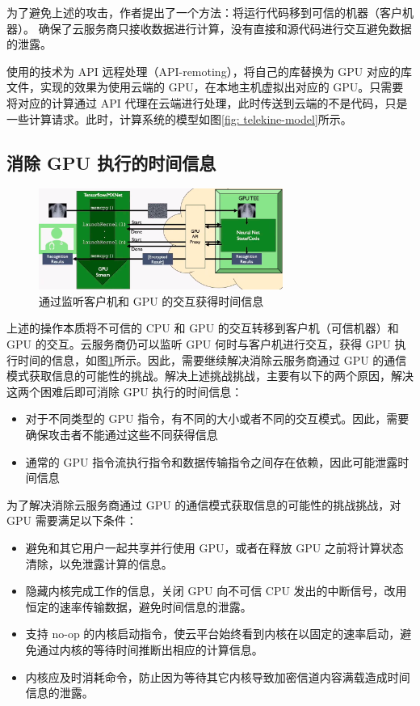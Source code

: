 \documentclass{ctexart}
\begin{document}
为了避免上述的攻击，作者提出了一个方法：将运行代码移到可信的机器（客户机器）。
确保了云服务商只接收数据进行计算，没有直接和源代码进行交互避免数据的泄露。

使用的技术为 API 远程处理（API-remoting），将自己的库替换为 GPU 对应的库文件，实现的效果为使用云端的 GPU，在本地主机虚拟出对应的 GPU。只需要将对应的计算通过 API 代理在云端进行处理，此时传送到云端的不是代码，只是一些计算请求。此时，计算系统的模型如图\ref{fig: telekine-model}所示。

\subsection{消除 GPU 执行的时间信息}

\begin{figure}
    \centering
    \includegraphics[width=8cm]{images/remote-api.png}
    \caption{通过监听客户机和 GPU 的交互获得时间信息}
    \label{fig: remote-api}
\end{figure}

上述的操作本质将不可信的 CPU 和 GPU 的交互转移到客户机（可信机器）和 GPU 的交互。云服务商仍可以监听 GPU 何时与客户机进行交互，获得 GPU 执行时间的信息，如图\ref{fig: remote-api}所示。因此，需要继续解决消除云服务商通过 GPU 的通信模式获取信息的可能性的挑战。解决上述挑战挑战，主要有以下的两个原因，解决这两个困难后即可消除 GPU 执行的时间信息：

\begin{itemize}
    \item 对于不同类型的 GPU 指令，有不同的大小或者不同的交互模式。因此，需要确保攻击者不能通过这些不同获得信息
    \item 通常的 GPU 指令流执行指令和数据传输指令之间存在依赖，因此可能泄露时间信息
\end{itemize}

为了解决消除云服务商通过 GPU 的通信模式获取信息的可能性的挑战挑战，对 GPU 需要满足以下条件：

\begin{itemize}
    \item 避免和其它用户一起共享并行使用 GPU，或者在释放 GPU 之前将计算状态清除，以免泄露计算的信息。
    \item 隐藏内核完成工作的信息，关闭 GPU 向不可信 CPU 发出的中断信号，改用恒定的速率传输数据，避免时间信息的泄露。
    \item 支持 no-op 的内核启动指令，使云平台始终看到内核在以固定的速率启动，避免通过内核的等待时间推断出相应的计算信息。
    \item 内核应及时消耗命令，防止因为等待其它内核导致加密信道内容满载造成时间信息的泄露。
\end{itemize}
\end{document}
